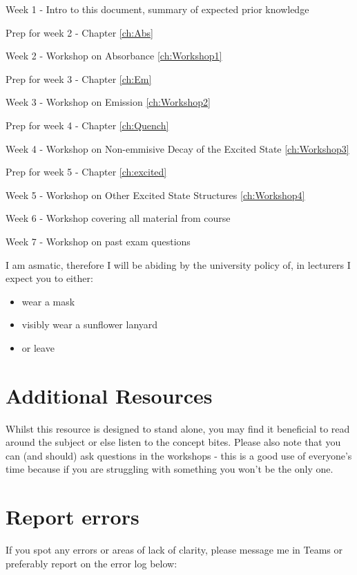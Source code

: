 \documentclass[
]{book}
\providecommand{\tightlist}{%
  \setlength{\itemsep}{0pt}\setlength{\parskip}{0pt}}
\begin{document}
Week 1 - Intro to this document, summary of expected prior knowledge

Prep for week 2 - Chapter \ref{ch:Abs}

Week 2 - Workshop on Absorbance \ref{ch:Workshop1}

Prep for week 3 - Chapter \ref{ch:Em}

Week 3 - Workshop on Emission \ref{ch:Workshop2}

Prep for week 4 - Chapter \ref{ch:Quench}

Week 4 - Workshop on Non-emmisive Decay of the Excited State \ref{ch:Workshop3}

Prep for week 5 - Chapter \ref{ch:excited}

Week 5 - Workshop on Other Excited State Structures \ref{ch:Workshop4}

Week 6 - Workshop covering all material from course

Week 7 - Workshop on past exam questions

I am asmatic, therefore I will be abiding by the university policy of, in lecturers I expect you to either:

\begin{itemize}
\tightlist
\item
  wear a mask
\item
  visibly wear a sunflower lanyard
\item
  or leave
\end{itemize}

\hypertarget{sec:AddnRes}{%
\section{Additional Resources}\label{sec:AddnRes}}

Whilst this resource is designed to stand alone, you may find it beneficial to read around the subject or else listen to the concept bites. Please also note that you can (and should) ask questions in the workshops - this is a good use of everyone's time because if you are struggling with something you won't be the only one.

\hypertarget{report-errors}{%
\section{Report errors}\label{report-errors}}

If you spot any errors or areas of lack of clarity, please message me in Teams or preferably report on the error log below:
\end{document}

